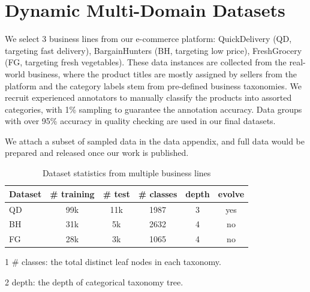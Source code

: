 \section{Dynamic Multi-Domain Datasets}
We select 3 business lines from our e-commerce platform: 
QuickDelivery (QD, targeting fast delivery), BargainHunters (BH, targeting low price), FreshGrocery (FG, targeting fresh vegetables). 
These data instances 
are collected from the real-world business, where the product titles are mostly assigned by sellers from the platform and the category labels stem from pre-defined business taxonomies. 
We recruit experienced annotators to manually classify the products into assorted categories, with 1\% sampling to guarantee the annotation accuracy. 
Data groups with over 95\% accuracy in quality checking are used in our final datasets. 

We attach a subset of sampled data in the data appendix, and full data would be prepared and released once our work is published. 

\begin{table}[th]
\setlength{\tabcolsep}{5.2pt}
\begin{threeparttable}[b]
  \caption{Dataset statistics from multiple business lines}
  \label{tb:dataset}
  \centering
  \begin{tabular}{l|ccccc}
    \toprule
    Dataset & \# training  & \# test  & \# classes & depth  & evolve \\
    \midrule
    \small{QD} & 99k & 11k & 1987 & 3 & yes  \\
    \small{BH} & 31k & 5k & 2632 & 4 & no \\
    \small{FG} & 28k & 3k & 1065 & 4 & no \\
    \bottomrule
  \end{tabular}
  \begin{tablenotes}
    \item[1] \# classes: the total distinct leaf nodes in each taxonomy.
    \item[2] depth: the depth of categorical taxonomy tree.
  \end{tablenotes}
  \end{threeparttable}
\end{table}

